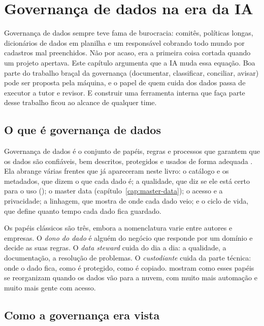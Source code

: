 \chapter{Governança de dados na era da IA}
\label{cap:governanca}

Governança de dados sempre teve fama de burocracia: comitês, políticas longas,
dicionários de dados em planilha e um responsável cobrando todo mundo por cadastros mal
preenchidos. Não por acaso, era a primeira coisa cortada quando um projeto apertava. Este
capítulo argumenta que a IA muda essa equação. Boa parte do trabalho braçal da governança
(documentar, classificar, conciliar, avisar) pode ser proposta pela máquina, e o papel de
quem cuida dos dados passa de executor a tutor e revisor. E construir uma ferramenta interna
que faça parte desse trabalho ficou ao alcance de qualquer time.

\section{O que é governança de dados}
\label{sec:gov-o-que-e}

Governança de dados é o conjunto de papéis, regras e processos que garantem que os dados
são confiáveis, bem descritos, protegidos e usados de forma adequada \parencite{dama2017}.
Ela abrange várias frentes que já apareceram neste livro: o catálogo e os metadados, que
dizem o que cada dado é; a qualidade, que diz se ele está certo para o uso
(); o master data (capítulo~\ref{cap:master-data}); o acesso e
a privacidade; a linhagem, que mostra de onde cada dado veio; e o ciclo de vida, que define
quanto tempo cada dado fica guardado.

Os papéis clássicos são três, embora a nomenclatura varie entre autores e empresas. O
\emph{dono do dado} é alguém do negócio que responde por um domínio e decide as suas regras.
O \emph{data steward} cuida do dia a dia: a qualidade, a documentação, a resolução de
problemas. O \emph{custodiante} cuida da parte técnica: onde o dado fica, como é protegido,
como é copiado. 
\textcite{eryurek2021} mostram como esses papéis se reorganizam quando os dados vão para a
nuvem, com muito mais automação e muito mais gente com acesso.

\section{Como a governança era vista}
\label{sec:gov-antes}

